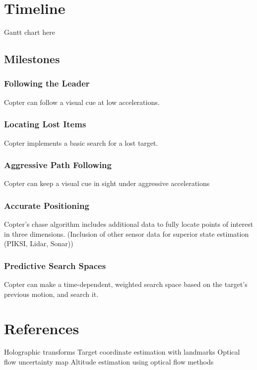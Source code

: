 \documentclass[a4paper, 11pt, titlepage]{article}
\begin{document}
  \section{Timeline}
    Gantt chart here
    \subsection{Milestones}

    \subsubsection{Following the Leader}
      Copter can follow a visual cue at low accelerations.

    \subsubsection{Locating Lost Items}
      Copter implements a basic search for a lost target.

    \subsubsection{Aggressive Path Following}
      Copter can keep a visual cue in sight under aggressive accelerations

    \subsubsection{Accurate Positioning}
      Copter's chase algorithm includes additional data to fully locate points of interest in three dimensions.
        (Inclusion of other sensor data for superior state estimation (PIKSI, Lidar, Sonar))

    \subsubsection{Predictive Search Spaces}
      Copter can make a time-dependent, weighted search space based on the target's previous motion, and search it.


  \section{References}
    Holographic transforms
    Target coordinate estimation with landmarks
    Optical flow uncertainty map
    Altitude estimation using optical flow methods











	
\end{document}
